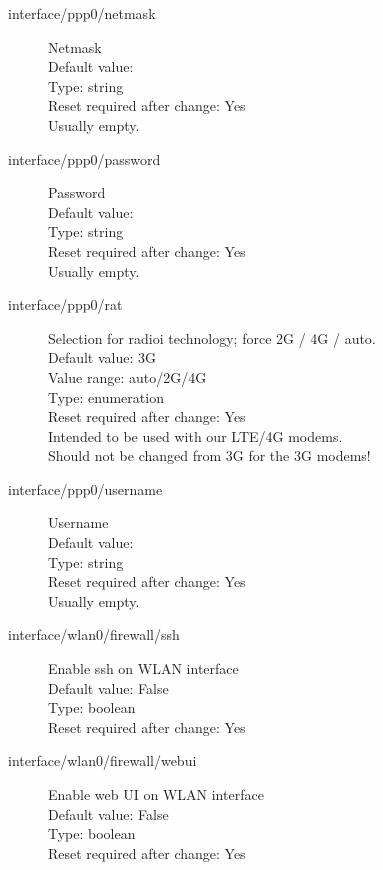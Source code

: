 \begin{description}
\item[interface/ppp0/netmask] Netmask\\
  Default value: \\
  Type: string\\
  Reset required after change: Yes\\
  Usually empty.\\

\item[interface/ppp0/password] Password\\
  Default value: \\
  Type: string\\
  Reset required after change: Yes\\
   Usually empty.\\

\item[interface/ppp0/rat] Selection for radioi technology; force 2G / 4G / auto. \\
  Default value: 3G\\
  Value range: auto/2G/4G\\
  Type: enumeration\\
  Reset required after change: Yes\\
  Intended to be used with our LTE/4G modems. \\ Should not be changed from 3G for the 3G modems!\\

\item[interface/ppp0/username] Username\\
  Default value: \\
  Type: string\\
  Reset required after change: Yes\\
   Usually empty.\\

\item[interface/wlan0/firewall/ssh] Enable ssh on WLAN interface\\
  Default value: False\\
  Type: boolean\\
  Reset required after change: Yes\\

\item[interface/wlan0/firewall/webui] Enable web UI on WLAN interface\\
  Default value: False\\
  Type: boolean\\
  Reset required after change: Yes\\


\end{description}
